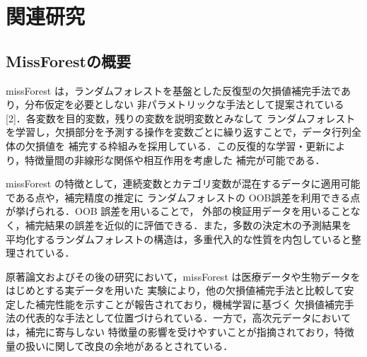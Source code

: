\section{関連研究}
\subsection{MissForestの概要}
missForest は，ランダムフォレストを基盤とした反復型の欠損値補完手法であり，分布仮定を必要としない
非パラメトリックな手法として提案されている[2]．各変数を目的変数，残りの変数を説明変数とみなして
ランダムフォレストを学習し，欠損部分を予測する操作を変数ごとに繰り返すことで，データ行列全体の欠損値を
補完する枠組みを採用している．この反復的な学習・更新により，特徴量間の非線形な関係や相互作用を考慮した
補完が可能である．

missForest の特徴として，連続変数とカテゴリ変数が混在するデータに適用可能である点や，補完精度の推定に
ランダムフォレストの OOB誤差を利用できる点が挙げられる．OOB 誤差を用いることで，
外部の検証用データを用いることなく，補完結果の誤差を近似的に評価できる．また，多数の決定木の予測結果を
平均化するランダムフォレストの構造は，多重代入的な性質を内包していると整理されている．

原著論文およびその後の研究において，missForest は医療データや生物データをはじめとする実データを用いた
実験により，他の欠損値補完手法と比較して安定した補完性能を示すことが報告されており，機械学習に基づく
欠損値補完手法の代表的な手法として位置づけられている．一方で，高次元データにおいては，補完に寄与しない
特徴量の影響を受けやすいことが指摘されており，特徴量の扱いに関して改良の余地があるとされている．
